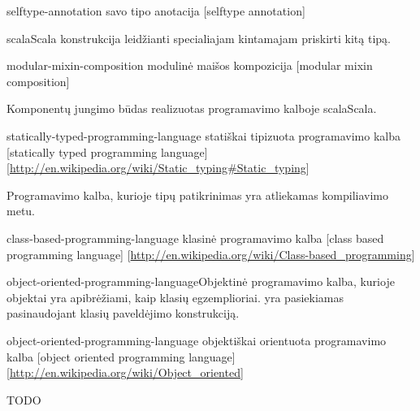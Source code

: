 \begin{glossary}
\begin{entry}
  \end{entry}

  \begin{entry}%
    {selftype-annotation}%
    {savo tipo anotacija}%
    [selftype annotation]

    \gls{scala}{Scala} konstrukcija leidžianti specialiajam kintamajam
     priskirti kitą tipą.

  \end{entry}

  \begin{entry}%
    {modular-mixin-composition}%
    {modulinė maišos kompozicija}%
    [modular mixin composition]

    Komponentų jungimo būdas realizuotas programavimo kalboje
    \gls{scala}{Scala}.
    
  \end{entry}

  \begin{entry}%
    {statically-typed-programming-language}%
    {statiškai tipizuota programavimo kalba}%
    [statically typed programming language]%
    [\url{http://en.wikipedia.org/wiki/Static_typing\#Static_typing}]

    Programavimo kalba, kurioje tipų patikrinimas yra atliekamas
    kompiliavimo metu.
    
  \end{entry}

  \begin{entry}%
    {class-based-programming-language}%
    {klasinė programavimo kalba}%
    [class based programming language]%
    [\url{http://en.wikipedia.org/wiki/Class-based_programming}]

    \gls{object-oriented-programming-language}{Objektinė programavimo
    kalba}, kurioje objektai yra apibrėžiami,
    kaip klasių egzemplioriai.  yra pasiekiamas
    pasinaudojant klasių paveldėjimo konstrukciją.

  \end{entry}
    
  \begin{entry}%
    {object-oriented-programming-language}%
    {objektiškai orientuota programavimo kalba}%
    [object oriented programming language]%
    [\url{http://en.wikipedia.org/wiki/Object_oriented}]

    TODO
    
  \end{entry}



\end{glossary}
